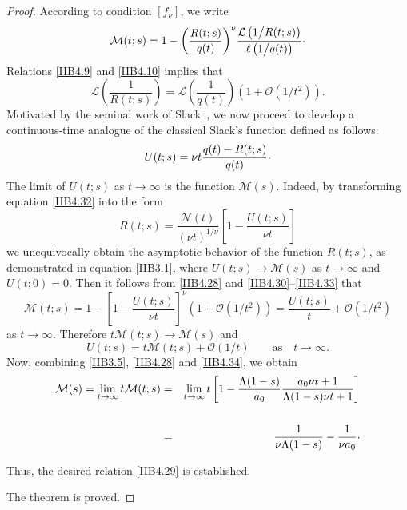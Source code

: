 \documentclass[10pt,reqno]{amsart}
\theoremstyle{definition}
\numberwithin{equation}{section}
\begin{document}
\begin{proof}
    According to condition $[{f}_{\nu}]$, we write
\begin{equation}                \label{IIB4.30}
    \mathcal{M}(t;s)=1-{{\left(\frac{R(t;s)}{q(t)}\right)}^{\nu}}
    \frac{\mathcal{L}\left({1}\big/{R(t;s)}\right)}{\ell\left({1}\big/{q(t)}\right)}{\raise1.5pt\hbox{.}}
\end{equation}
    Relations {\eqref{IIB4.9}} and {\eqref{IIB4.10}} implies that
\begin{equation}                \label{IIB4.31}
    \mathcal{L}\left(\frac{1}{R(t;s)}\right)=
    \mathcal{L}\left(\frac{1}{q(t)}\right)\left(1+\mathcal{O}\left({1}\big/{{{t}^{2}}}\right)\right).
\end{equation}
    Motivated by the seminal work of Slack~{\cite{Slack68}}, we now proceed to develop a continuous-time
    analogue of the classical Slack's function defined as follows:
\begin{equation}                \label{IIB4.32}
    U(t;s)=\nu{t}\frac{q(t)-R(t;s)}{q(t)}{\raise1.5pt\hbox{.}}
\end{equation}
    The limit of $U(t;s)$ as $t\to\infty$ is the function $\mathcal{M}(s)$. Indeed, by transforming
    equation {\eqref{IIB4.32}} into the form
\begin{equation}                \label{IIB4.33}
    R(t;s)=\frac{\mathcal{N}(t)}{{{(\nu{t})}^{{1}/{\nu}}}}\left[1-\frac{U(t;s)}{\nu{t}}\right]
\end{equation}
    we unequivocally obtain the asymptotic behavior of the function $R(t;s)$, as demonstrated in
    equation {\eqref{IIB3.1}}, where $U(t;s)\to\mathcal{M}(s)$ as $t\to\infty$ and $U(t;0)=0$.
    Then it follows from {\eqref{IIB4.28}} and {\eqref{IIB4.30}}--{\eqref{IIB4.33}} that
\[
    \mathcal{M}(t;s)=1-{{\left[1-\frac{U(t;s)}{\nu{t}}\right]}^{\nu}}
    \left(1+\mathcal{O}\left({1}\big/{{{t}^{2}}}\right)\right)=
    \frac{U(t;s)}{t}+\mathcal{O}\left({1}\big/{{{t}^{2}}}\right)
\]
    as $t\to\infty$. Therefore $t\mathcal{M}(t;s)\to\mathcal{M}(s)$ and
\begin{equation}                \label{IIB4.34}
    U(t;s)=t\mathcal{M}(t;s)+\mathcal{O}\left({1}\big/{t}\right) \qquad {\text{as}} \quad {t\to\infty}.
\end{equation}
    Now, combining {\eqref{IIB3.5}}, {\eqref{IIB4.28}} and {\eqref{IIB4.34}}, we obtain
\begin{eqnarray*}
    {\mathcal{M}(s)=\lim_{t\to\infty }t\mathcal{M}(t;s)}
& = & \lim_{t\to\infty}t\left[1-\frac{\Lambda(1-s)}{{{a}_{0}}}
        \frac{{{a}_{0}}\nu{t}+1}{\Lambda(1-s)\nu{t}+1}\right] \nonumber\\
\ \nonumber\\
& = & \frac{1}{\nu\Lambda(1-s)}-\frac{1}{\nu{{a}_{0}}}{\raise1.5pt\hbox{.}}
\end{eqnarray*}

    Thus, the desired relation {\eqref{IIB4.29}} is established.

    The theorem is proved.
\end{proof}
\end{document}
